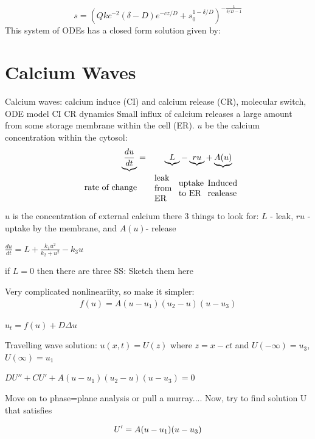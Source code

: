 \documentclass[]{article}
\numberwithin{equation}{section}		%
\def\bea{\begin{eqnarray}}
\def\ena{\end{eqnarray}}
\begin{document}
$$s=(Qkc^{-2}(\delta-D)e^{-cz/D}+s_0^{1-\delta/D})^{-\frac{1}{\delta/D-1}}$$ 
This system of ODEs has a closed form solution given by:

%
\section{Calcium Waves}
Calcium waves: calcium induce (CI) and calcium release (CR), molecular switch, ODE model CI CR dynamics
Small influx of calcium releases a large amount from some storage membrane within the cell (ER).
$u$ be the calcium concentration within the cytosol:
\bea
\underbrace{\frac{du}{dt}}&=& \underbrace{L}-\underbrace{ru}+\underbrace{A (u )} \\ \nonumber
\textrm{rate of change}  && \parbox{1cm}{\textrm{leak from ER}}  \parbox{1cm}{\textrm{uptake to ER}} \hspace{.2cm}   \parbox{1cm}{\textrm{Induced realease}  }
\ena

   $u$ is the concentration of external calcium there 3 things to look for: $L$ - leak, $ru$ - uptake by the membrane, and $A(u)$- release

   \begin{center}
   $\frac{du}{dt}= L + \frac{k_{1}u^{2}}{k_{2}+u^{2}}-k_{3}u$
   \end{center}
   if $L=0$ then there are three SS:
Sketch them here

Very complicated nonlineariity, so make it simpler:
\bea
 f(u)= A (u-u_{1} ) (u_{2}-u ) (u-u_{3} )
 \ena

   $u_{t}= f (u )+D\Delta u$


   Travelling wave solution: $u (x,t )= U (z )$ where $z = x-ct$ and $U(-\infty) = u_{3}$,  $ U(\infty) = u_{1}$

   \begin{center}
   $DU'' + CU'+ A (u-u_{1} ) (u_{2}-u ) (u-u_{3} )=0$
   \end{center}
Move on to phase=plane analysis or pull a murray....
   Now, try to find solution U that satisfies

   $$U' = A (u-u_{1} ) (u-u_{3} )\\$$
\end{document}
